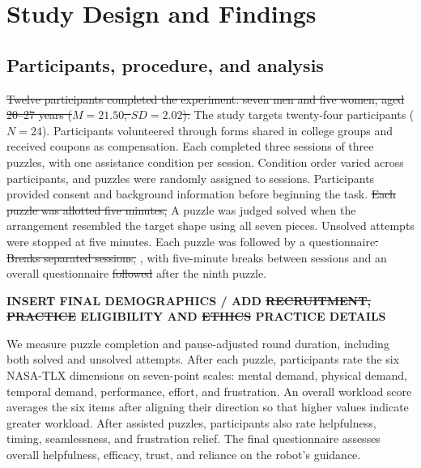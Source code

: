 \documentclass[sigconf,anonymous,balance=false]{aamas} %
\DeclareRobustCommand{\DIFadd}[1]{{\color{reviewadd}#1}} %
\DeclareRobustCommand{\DIFdel}[1]{{\color{reviewdel}\sout{#1}}} %
\providecommand{\DIFaddbegin}{} %
\providecommand{\DIFaddend}{} %
\providecommand{\DIFdelbegin}{} %
\providecommand{\DIFdelend}{} %
\providecommand{\DIFscaledelfig}{0.5}
\newlength{\DIFdelgraphicswidth} %
\newlength{\DIFdelgraphicsheight} %
\providecommand{\DIFaddincludegraphics}[2][]{{\color{blue}\fbox{\DIFOincludegraphics[#1]{#2}}}} %
\providecommand{\DIFdelincludegraphics}[2][]{%
\sbox{\DIFdelgraphicsbox}{\DIFOincludegraphics[#1]{#2}}%
\settoboxwidth{\DIFdelgraphicswidth}{\DIFdelgraphicsbox} %
\settoboxtotalheight{\DIFdelgraphicsheight}{\DIFdelgraphicsbox} %
\scalebox{\DIFscaledelfig}{%
\parbox[b]{\DIFdelgraphicswidth}{\usebox{\DIFdelgraphicsbox}\\[-\baselineskip] \rule{\DIFdelgraphicswidth}{0em}}\llap{\resizebox{\DIFdelgraphicswidth}{\DIFdelgraphicsheight}{%
\setlength{\unitlength}{\DIFdelgraphicswidth}%
\begin{picture}(1,1)%
\thicklines\linethickness{2pt} %
{\color[rgb]{1,0,0}\put(0,0){\framebox(1,1){}}}%
{\color[rgb]{1,0,0}\put(0,0){\line( 1,1){1}}}%
{\color[rgb]{1,0,0}\put(0,1){\line(1,-1){1}}}%
\end{picture}%
}\hspace*{3pt}}} %
} %
\DeclareRobustCommand{\DIFaddbegin}{\DIFOaddbegin \let\includegraphics\DIFaddincludegraphics} %
\DeclareRobustCommand{\DIFaddend}{\DIFOaddend \let\includegraphics\DIFOincludegraphics} %
\DeclareRobustCommand{\DIFdelbegin}{\DIFOdelbegin \let\includegraphics\DIFdelincludegraphics} %
\DeclareRobustCommand{\DIFdelend}{\DIFOaddend \let\includegraphics\DIFOincludegraphics} %
\begin{document}
\section{Study Design and Findings}

\subsection{Participants, procedure, and analysis}

\DIFdelbegin \DIFdel{Twelve participants completed the experiment: seven men and five women, aged 20--27 years ($M=21.50$, $SD=2.02$). }\DIFdelend \DIFaddbegin \DIFadd{The study targets twenty-four participants ($N=24$). Participants volunteered through forms shared in college groups and received coupons as compensation. }\DIFaddend Each completed three sessions of three puzzles, with one assistance condition per session. Condition order varied across participants, and puzzles were randomly assigned to sessions. Participants provided consent and background information before beginning the task. \DIFdelbegin \DIFdel{Each puzzle was allotted five minutes, }\DIFdelend \DIFaddbegin \DIFadd{A puzzle was judged solved when the arrangement resembled the target shape using all seven pieces. Unsolved attempts were stopped at five minutes. Each puzzle was }\DIFaddend followed by a questionnaire\DIFdelbegin \DIFdel{. Breaks separated sessions, }\DIFdelend \DIFaddbegin \DIFadd{, with five-minute breaks between sessions }\DIFaddend and an overall questionnaire \DIFdelbegin \DIFdel{followed }\DIFdelend \DIFaddbegin \DIFadd{after }\DIFaddend the ninth puzzle.

\textbf{\DIFaddbegin \DIFadd{INSERT FINAL DEMOGRAPHICS / }\DIFaddend ADD \DIFdelbegin \DIFdel{RECRUITMENT, PRACTICE }\DIFdelend \DIFaddbegin \DIFadd{ELIGIBILITY }\DIFaddend AND \DIFdelbegin \DIFdel{ETHICS }\DIFdelend \DIFaddbegin \DIFadd{PRACTICE }\DIFaddend DETAILS}

We measure puzzle completion and pause-adjusted round duration, including both solved and unsolved attempts. After each puzzle, participants rate the six NASA-TLX dimensions on seven-point scales: mental demand, physical demand, temporal demand, performance, effort, and frustration. An overall workload score averages the six items after aligning their direction so that higher values indicate greater workload. After assisted puzzles, participants also rate helpfulness, timing, seamlessness, and frustration relief. The final questionnaire assesses overall helpfulness, efficacy, trust, and reliance on the robot's guidance.
\end{document}
